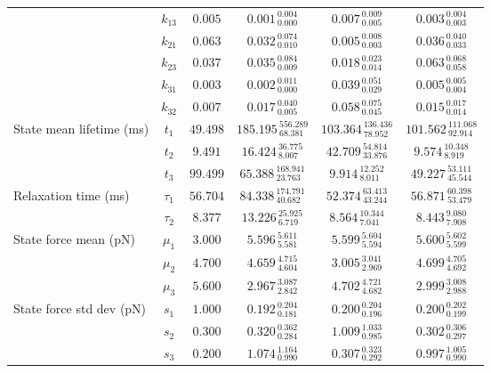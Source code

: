 \begin{table*}
\begin{tabular*}{\textwidth}{@{\extracolsep{\fill}}lccccc}
		& $k_{13}$ & $0.005$ & $0.001_{\:0.000}^{\:0.004}$ & $0.007_{\:0.005}^{\:0.009}$ & $0.003_{\:0.003}^{\:0.004}$ \\
		& $k_{21}$ & $0.063$ & $0.032_{\:0.010}^{\:0.074}$ & $0.005_{\:0.003}^{\:0.008}$ & $0.036_{\:0.033}^{\:0.040}$ \\
		& $k_{23}$ & $0.037$ & $0.035_{\:0.009}^{\:0.084}$ & $0.018_{\:0.014}^{\:0.023}$ & $0.063_{\:0.058}^{\:0.068}$ \\
		& $k_{31}$ & $0.003$ & $0.002_{\:0.000}^{\:0.011}$ & $0.039_{\:0.029}^{\:0.051}$ & $0.005_{\:0.004}^{\:0.005}$ \\
		& $k_{32}$ & $0.007$ & $0.017_{\:0.005}^{\:0.040}$ & $0.058_{\:0.045}^{\:0.075}$ & $0.015_{\:0.014}^{\:0.017}$ \\
		\hline
		State mean lifetime (ms) 		& $t_{1}$ & $49.498$ & $185.195_{\:68.381}^{\:556.289}$ & $103.364_{\:78.952}^{\:136.436}$ & $101.562_{\:92.914}^{\:111.068}$ \\
		& $t_{2}$ & $9.491$ & $16.424_{\:8.007}^{\:36.775}$ & $42.709_{\:33.876}^{\:54.814}$ & $9.574_{\:8.919}^{\:10.348}$ \\
		& $t_{3}$ & $99.499$ & $65.388_{\:23.763}^{\:168.941}$ & $9.914_{\:8.011}^{\:12.252}$ & $49.227_{\:45.544}^{\:53.111}$ \\
		\hline
		Relaxation time (ms) 		& $\tau_{1}$ & $56.704$ & $84.338_{\:40.682}^{\:174.791}$ & $52.374_{\:43.244}^{\:63.413}$ & $56.871_{\:53.479}^{\:60.398}$ \\
		& $\tau_{2}$ & $8.377$ & $13.226_{\:6.719}^{\:25.925}$ & $8.564_{\:7.041}^{\:10.344}$ & $8.443_{\:7.908}^{\:9.080}$ \\
		\hline
		\hline
		State force mean (pN) 		& $\mu_{1}$ & $3.000$ & $5.596_{\:5.581}^{\:5.611}$ & $5.599_{\:5.594}^{\:5.604}$ & $5.600_{\:5.599}^{\:5.602}$ \\
		& $\mu_{2}$ & $4.700$ & $4.659_{\:4.604}^{\:4.715}$ & $3.005_{\:2.969}^{\:3.041}$ & $4.699_{\:4.692}^{\:4.705}$ \\
		& $\mu_{3}$ & $5.600$ & $2.967_{\:2.842}^{\:3.087}$ & $4.702_{\:4.682}^{\:4.721}$ & $2.999_{\:2.988}^{\:3.008}$ \\
		\hline
		State force std dev (pN) 		& $s_{1}$ & $1.000$ & $0.192_{\:0.181}^{\:0.204}$ & $0.200_{\:0.196}^{\:0.204}$ & $0.200_{\:0.199}^{\:0.202}$ \\
		& $s_{2}$ & $0.300$ & $0.320_{\:0.284}^{\:0.362}$ & $1.009_{\:0.985}^{\:1.033}$ & $0.302_{\:0.297}^{\:0.306}$ \\
		& $s_{3}$ & $0.200$ & $1.074_{\:0.990}^{\:1.164}$ & $0.307_{\:0.292}^{\:0.323}$ & $0.997_{\:0.990}^{\:1.005}$ \\
		\hline
\hline
\end{tabular*}
\end{table*}
